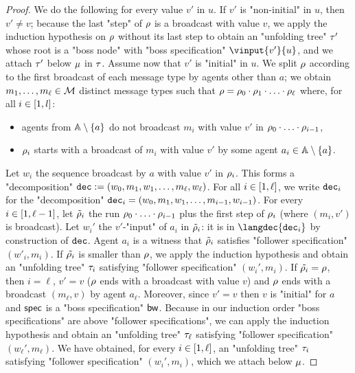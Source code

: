 \begin{proof}
	We do the following for every value $v'$ in $u$.
	If $v'$ is "non-initial" in $u$, then $v' \ne v$; because the last "step" of $\rho$ is a broadcast with value $v$, we apply the induction hypothesis on $\rho$ without its last step to obtain an "unfolding tree" $\tau'$ whose root is a "boss node" with "boss specification" $\vinput{v'}{u}$, and we attach $\tau'$ below $\mu$ in $\tau$.
	Assume now that $v'$ is "initial" in $u$. We split $\rho$ according to the first broadcast of each message type by agents other than $a$; we obtain $m_1, \dots, m_\ell \in \mathcal{M}$ distinct message types such that $\rho = \rho_0 \cdot \rho_1 \cdot \ldots \cdot \rho_\ell$ where, for all $i \in [1,l]$:
	\begin{itemize}
	\item agents from $\mathbb{A} \setminus \{a\}$ do not broadcast $m_i$ with value $v'$ in $\rho_0 \cdot \ldots \cdot \rho_{i-1}$,
	\item $\rho_i$ starts with a broadcast of $m_i$ with value $v'$ by some agent $a_i \in \mathbb{A} \setminus \{a\}$.
	\end{itemize} 
	
	Let $w_i$ the sequence broadcast by $a$ with value $v'$ in $\rho_i$. This forms a "decomposition" $\mathtt{dec} := (w_0, m_1, w_1, \ldots, m_\ell, w_\ell)$.
	For all $i \in [1,\ell]$, we write $\mathtt{dec}_i$ for the "decomposition" $\mathtt{dec}_i = (w_0, m_1, w_1, \ldots, m_{i-1}, w_{i-1})$. 
	For every $i \in [1,\ell-1]$, let $\tilde{\rho}_i$ the run $\rho_0 \cdot \ldots \cdot \rho_{i-1}$ plus the first step of $\rho_i$ (where $(m_i,v')$ is broadcast).
	Let $w_i'$ the $v'$-"input" of $a_i$ in $\tilde{\rho}_i$: it is in $\langdec{\decsymb_i}$ by construction of $\mathtt{dec}$. Agent $a_i$ is a witness that $\tilde{\rho}_i$ satisfies "follower specification" $(w'_i, m_i)$. 
	If $\tilde{\rho_i}$ is smaller than $\rho$, we apply the induction hypothesis and obtain an "unfolding tree" $\tau_i$ satisfying "follower specification" $(w_i', m_i)$. If $\tilde{\rho_i} = \rho$, then $i = \ell$, $v'=v$ ($\rho$ ends with a broadcast with value $v$) and $\rho$ ends with a broadcast $(m_\ell,v)$ by agent $a_\ell$. Moreover, since $v'=v$ then $v$ is "initial" for $a$ and $\mathsf{spec}$ is a "boss specification" $\mathsf{bw}$. Because in our induction order "boss specifications" are above "follower specifications", we can apply the induction hypothesis and obtain an "unfolding tree" $\tau_\ell$ satisfying "follower specification" $(w_\ell', m_\ell)$. We have obtained, for every $i \in [1,\ell]$, an "unfolding tree" $\tau_i$ satisfying "follower specification" $(w_i', m_i)$, which we attach below $\mu$. 
	

\end{proof}
